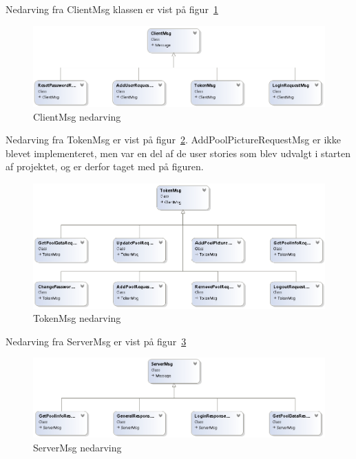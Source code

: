 Nedarving fra ClientMsg klassen er vist på figur~\ref{fig:ClientMsgUML}
\begin{figure}
	\centering
	\includegraphics[width=0.9\linewidth]{figs/connection/ClientMsgUML.png}
	\caption{ClientMsg nedarving}
	\label{fig:ClientMsgUML}
\end{figure}

Nedarving fra TokenMsg er vist på figur~\ref{fig:TokenMsgUML}. AddPoolPictureRequestMsg er ikke blevet implementeret, men var en del af de user stories som blev udvalgt i starten af projektet, og er derfor taget med på figuren.
\begin{figure}
	\centering
	\includegraphics[width=0.9\linewidth]{figs/connection/TokenMsgUML.png}
	\caption{TokenMsg nedarving}
	\label{fig:TokenMsgUML}
\end{figure}

Nedarving fra ServerMsg er vist på figur~\ref{fig:ServerMsgUML}
\begin{figure}
	\centering
	\includegraphics[width=0.9\linewidth]{figs/connection/ServerMsgUML.png}
	\caption{ServerMsg nedarving}
	\label{fig:ServerMsgUML}
\end{figure}

